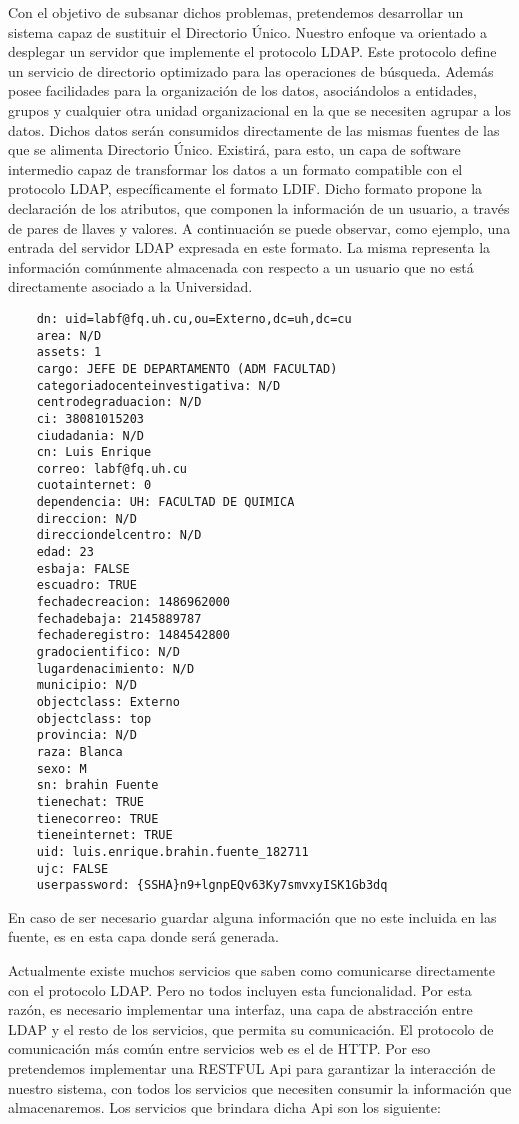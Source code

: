 Con el objetivo de subsanar dichos problemas, pretendemos desarrollar un sistema capaz de
sustituir el Directorio Único. Nuestro enfoque va orientado a desplegar un servidor que
implemente el protocolo LDAP. Este protocolo define un servicio de directorio optimizado para
las operaciones de búsqueda. Además posee facilidades para la organización de los datos, 
asociándolos a entidades, grupos y cualquier otra unidad organizacional en la que se necesiten
agrupar a los datos. Dichos datos serán consumidos directamente de las mismas fuentes de las
que se alimenta Directorio Único. Existirá, para esto, un capa de software intermedio capaz de
transformar los datos a un formato compatible con el protocolo LDAP, específicamente el formato 
LDIF. Dicho formato propone la declaración de los atributos, que componen la información de un 
usuario, a través de pares de llaves y valores. A continuación se puede observar, como ejemplo,
una entrada del servidor LDAP expresada en este formato. La misma representa la información
comúnmente almacenada con respecto a un usuario que no está directamente asociado a la Universidad.

\begin{verbatim}
	dn: uid=labf@fq.uh.cu,ou=Externo,dc=uh,dc=cu
	area: N/D
	assets: 1
	cargo: JEFE DE DEPARTAMENTO (ADM FACULTAD)
	categoriadocenteinvestigativa: N/D
	centrodegraduacion: N/D
	ci: 38081015203
	ciudadania: N/D
	cn: Luis Enrique
	correo: labf@fq.uh.cu
	cuotainternet: 0
	dependencia: UH: FACULTAD DE QUIMICA
	direccion: N/D
	direcciondelcentro: N/D
	edad: 23
	esbaja: FALSE
	escuadro: TRUE
	fechadecreacion: 1486962000
	fechadebaja: 2145889787
	fechaderegistro: 1484542800
	gradocientifico: N/D
	lugardenacimiento: N/D
	municipio: N/D
	objectclass: Externo
	objectclass: top
	provincia: N/D
	raza: Blanca
	sexo: M
	sn: brahin Fuente
	tienechat: TRUE
	tienecorreo: TRUE
	tieneinternet: TRUE
	uid: luis.enrique.brahin.fuente_182711
	ujc: FALSE
	userpassword: {SSHA}n9+lgnpEQv63Ky7smvxyISK1Gb3dq
\end{verbatim}

En caso de ser necesario guardar alguna información que no este incluida en las fuente, es en 
esta capa donde será generada.

Actualmente existe muchos servicios que saben como comunicarse directamente con el protocolo
LDAP. Pero no todos incluyen esta funcionalidad. Por esta razón, es necesario implementar
una interfaz, una capa de abstracción entre LDAP y el resto de los servicios, que permita su
comunicación. El protocolo de comunicación más común entre servicios web es el de HTTP. Por eso
pretendemos implementar una RESTFUL Api para garantizar la interacción de nuestro sistema, con
todos los servicios que necesiten consumir la información que almacenaremos. Los servicios
que brindara dicha Api son los siguiente:


